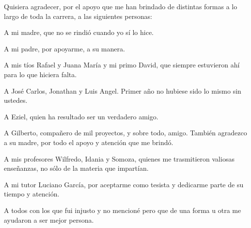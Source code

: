 \begin{acknowledgements}
	Quisiera agradecer, por el apoyo que me han brindado de distintas formas a lo largo de toda la carrera, a las siguientes personas:
	
	A mi madre, que no se rindió cuando yo sí lo hice.
	
	A mi padre, por apoyarme, a su manera.
	
	A mis tíos Rafael y Juana María y mi primo David, que siempre estuvieron ahí para lo que hiciera falta.
	
	A José Carlos, Jonathan y Luis Angel. Primer año no hubiese sido lo mismo sin ustedes.
	
	A Eziel, quien ha resultado ser un verdadero amigo. 
	
	A Gilberto, compañero de mil proyectos, y sobre todo, amigo. También agradezco a su madre, por todo el apoyo y atención que me brindó.	
	
	A mis profesores Wilfredo, Idania y Somoza, quienes me trasmitieron valiosas enseñanzas, no sólo de la materia que impartían.
	
	A mi tutor Luciano García, por aceptarme como tesista y dedicarme parte de su tiempo y atención.
	
	A todos con los que fui injusto y no mencioné pero que de una forma u otra me ayudaron a ser mejor persona.
\end{acknowledgements}
